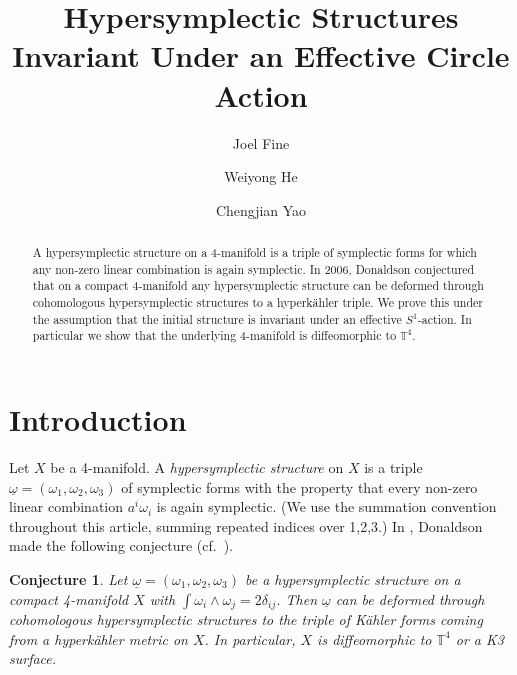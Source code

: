 \documentclass[11pt]{amsart}
\author[J. Fine]{Joel Fine}
\author[W.-Y. He]{Weiyong He}
\author[C.-J. Yao]{Chengjian Yao}
\theoremstyle{plain}
\newtheorem{conjecture}[theorem]{Conjecture}
\theoremstyle{definition}
\theoremstyle{plain}
\theoremstyle{definition}
\numberwithin{equation}{section}
\numberwithin{theorem}{section}
\begin{document}
	\title{Hypersymplectic Structures Invariant Under an Effective Circle Action}

\begin{abstract}
	A hypersymplectic structure on a 4-manifold is a triple of symplectic forms for which any non-zero linear combination is again symplectic. In 2006, Donaldson \cite{Don0} conjectured that on a compact 4-manifold any hypersymplectic structure can be deformed through cohomologous hypersymplectic structures to a hyperkähler triple. We prove this under the assumption that the initial structure is invariant under an effective $S^1$-action. In particular we show that the underlying 4-manifold is diffeomorphic to $\mathbb{T}^4$. 
\end{abstract}

\maketitle

\section{Introduction}

Let $X$ be a 4-manifold. A \emph{hypersymplectic structure} on $X$ is a triple $\underline{\omega} = (\omega_1, \omega_2, \omega_3)$ of symplectic forms with the property that every non-zero linear combination $a^i \omega_i$ is again symplectic. (We use the summation convention throughout this article, summing repeated indices over 1,2,3.) In \cite{Don0}, Donaldson made the following conjecture (cf.~\cite[Conjecture 1.1]{FY}).

\begin{conjecture}\label{Donaldson-conjecture}
Let $\underline{\omega} = (\omega_1, \omega_2, \omega_3)$ be a hypersymplectic structure on a compact 4-manifold $X$ with $\int \omega_i \wedge \omega_j = 2 \delta_{ij}$. Then $\underline{\omega}$ can be deformed through cohomologous hypersymplectic structures to the triple of K\"ahler forms coming from a hyperk\"ahler metric on $X$. In particular, $X$ is diffeomorphic to $\mathbb{T}^4$ or a K3 surface. 
\end{conjecture}
\end{document}
